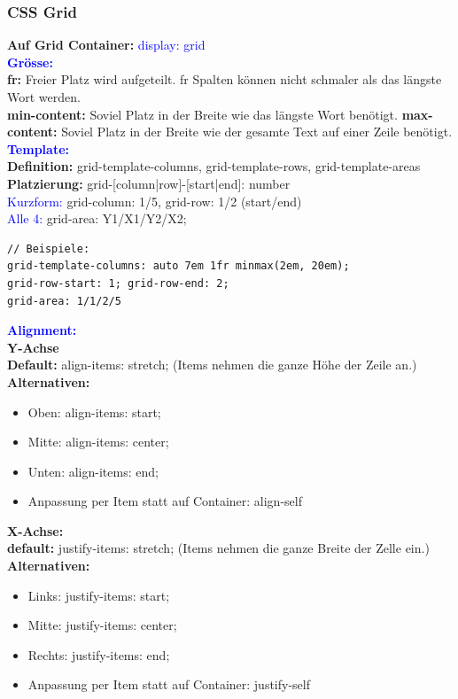 \subsubsection{CSS Grid}
\textbf{Auf Grid Container:} \textcolor{blue}{display: grid}\\
\textbf{\textcolor{blue}{Grösse:}}\\
\textbf{fr:} Freier Platz wird aufgeteilt. fr Spalten können nicht schmaler als das längste Wort werden.\\
\textbf{min-content:} Soviel Platz in der Breite wie das längste Wort benötigt.
\textbf{max-content:} Soviel Platz in der Breite wie der gesamte Text auf einer Zeile benötigt.
\textbf{\textcolor{blue}{Template:}}\\
\textbf{Definition:} grid-template-columns, grid-template-rows, grid-template-areas\\
\textbf{Platzierung:} grid-[column|row]-[start|end]: number\\
\textcolor{blue}{Kurzform:} grid-column: 1/5, grid-row: 1/2 (start/end)\\
\textcolor{blue}{Alle 4:} grid-area: Y1/X1/Y2/X2;
\begin{lstlisting}[style=htmlcssjs]
// Beispiele:
grid-template-columns: auto 7em 1fr minmax(2em, 20em);
grid-row-start: 1; grid-row-end: 2;
grid-area: 1/1/2/5
\end{lstlisting}
\textbf{\textcolor{blue}{Alignment:}}\\
\textbf{Y-Achse}\\
\textbf{Default:} align-items: stretch; (Items nehmen die ganze Höhe der Zeile an.)\\
\textbf{Alternativen:}
\begin{itemize}[topsep=0pt, leftmargin=3mm]
    \setlength\itemsep{-0.3em}
    \item Oben: align-items: start;
    \item Mitte: align-items: center;
    \item Unten: align-items: end;
    \item Anpassung per Item statt auf Container: align-self
\end{itemize}
\textbf{X-Achse:}\\
\textbf{default:} justify-items: stretch; (Items nehmen die ganze Breite der Zelle ein.)\\
\textbf{Alternativen:}
\begin{itemize}[topsep=0pt, leftmargin=3mm]
    \setlength\itemsep{-0.3em}
    \item Links: justify-items: start;
    \item Mitte: justify-items: center;
    \item Rechts: justify-items: end;
    \item Anpassung per Item statt auf Container: justify-self
\end{itemize}















